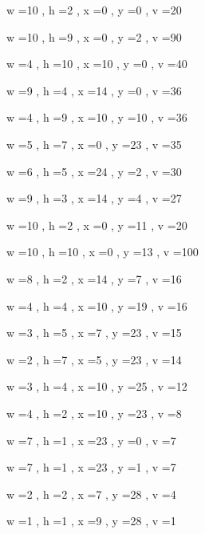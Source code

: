 \documentclass[11pt]{article}
\begin{document}
w =10 , h =2 , x =0 , y =0 , v =20
\par
w =10 , h =9 , x =0 , y =2 , v =90
\par
w =4 , h =10 , x =10 , y =0 , v =40
\par
w =9 , h =4 , x =14 , y =0 , v =36
\par
w =4 , h =9 , x =10 , y =10 , v =36
\par
w =5 , h =7 , x =0 , y =23 , v =35
\par
w =6 , h =5 , x =24 , y =2 , v =30
\par
w =9 , h =3 , x =14 , y =4 , v =27
\par
w =10 , h =2 , x =0 , y =11 , v =20
\par
w =10 , h =10 , x =0 , y =13 , v =100
\par
w =8 , h =2 , x =14 , y =7 , v =16
\par
w =4 , h =4 , x =10 , y =19 , v =16
\par
w =3 , h =5 , x =7 , y =23 , v =15
\par
w =2 , h =7 , x =5 , y =23 , v =14
\par
w =3 , h =4 , x =10 , y =25 , v =12
\par
w =4 , h =2 , x =10 , y =23 , v =8
\par
w =7 , h =1 , x =23 , y =0 , v =7
\par
w =7 , h =1 , x =23 , y =1 , v =7
\par
w =2 , h =2 , x =7 , y =28 , v =4
\par
w =1 , h =1 , x =9 , y =28 , v =1
\par
\newpage
\end{document}
